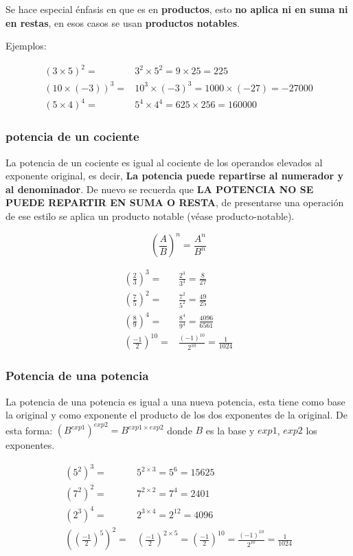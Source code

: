     Se hace especial énfasis en que es en \textbf{productos}, esto \textbf{no
    aplica ni en suma ni en restas}, en esos casos se usan \textbf{productos notables}.

    Ejemplos:

    \begin{align*}
        (3\times5)^2 =&3^2\times5^2= 9\times25=225		\\
        (10\times(-3))^3 =& 10^3 \times (-3)^3 = 1000\times(-27) = -27000\\
        (5\times4)^4 =&5^4\times4^4 = 625\times256= 160000
    \end{align*}



    \subsubsection*{potencia de un cociente}
    La potencia de un cociente es igual al cociente de los operandos elevados al
    exponente original, es decir, \textbf{La potencia puede repartirse al numerador
    y al denominador}. De nuevo se recuerda que \textbf{LA POTENCIA NO SE PUEDE
    REPARTIR EN SUMA O RESTA}, de presentarse una operación de ese estilo se
    aplica un producto notable (véase \refname{producto-notable}).

    $$ \left(\frac{A}{B}\right)^{n} = \frac{A^n}{B^n}  $$

    \begin{align*}
       \left(\frac{2}{3}\right)^{3} =& \frac{2^3}{3^3}= \frac{8}{27}	\\
        \left(\frac{7}{5}\right)^{2} =& \frac{7^2}{5^2} =\frac{49}{25} \\
        \left(\frac{8}{9}\right)^{4} =&\frac{8^4}{9^4} = \frac{4096}{6561}\\
        \left(\frac{-1}{2}\right)^{10} =& \frac{(-1)^10}{2^10} = \frac{1}{1024}
    \end{align*}

    \subsubsection*{Potencia de una potencia}
    La potencia de una potencia es igual a una nueva potencia, esta tiene como base
    la original y como exponente el producto de los dos exponentes
    de la original. De esta forma: $(B^{exp1})^{exp2} = B^{exp1\times exp2}$
    donde $B$ es la base y $exp1$, $exp2$ los exponentes.

    \begin{align*}
        \left(5^2\right)^{3} =& 5^{2\times3}= 5^6 =15625	\\
        \left(7^2\right)^{2} =& 7^{2\times2}= 7^4  =2401 \\
        \left(2^3\right)^{4} =& 2^{3\times4}=2^12  = 4096\\
        \left(\left(\frac{-1}{2}\right)^{5}\right)^2 =&\left(\frac{-1}{2}\right)^{2\times5}= \left(\frac{-1}{2}\right)^{10}=\frac{(-1)^{10}}{2^{10}} = \frac{1}{1024}
    \end{align*}

